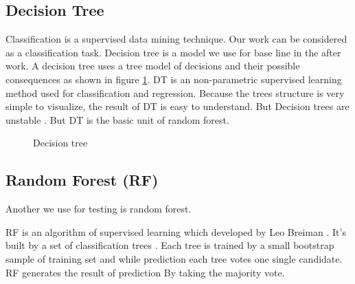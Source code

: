 \subsection{ Decision Tree} %
Classification is a supervised data mining technique. Our work can be considered as a classification task. Decision tree is a model we use for base line in the after work. A decision tree uses a tree model of decisions and their possible consequences as shown in figure \ref{fig:detrees}.  DT is an non-parametric supervised learning method used for classification and regression. Because the trees structure is very simple to visualize, the result of DT is easy to understand. But Decision trees are unstable \cite{breiman1996bagging}. But DT is the basic unit of random forest.
\begin{figure}[!h]
\center
{}

\caption{Decision tree}
\label{fig:detrees}

\end{figure}

\subsection{Random Forest (RF)} %
\label{random_forest}
 Another we use for testing is random forest.

RF is an algorithm of supervised learning which developed by Leo Breiman \cite{breiman2001random}. It's built by a set of classification trees \cite{breiman1984classification}. Each tree is trained by a small bootstrap sample of training set and while prediction each tree votes one single candidate. RF generates the result of prediction By taking the majority vote. 

